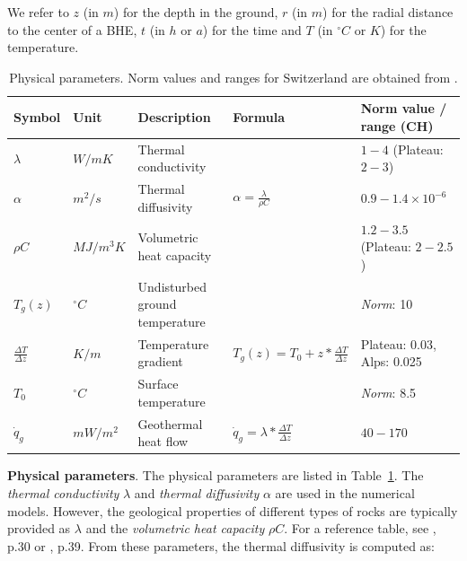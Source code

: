 We refer to $z$ (in $m$) for the depth in the ground, $r$ (in $m$) for the radial distance to the center of a BHE, $t$ (in $h$ or $a$) for the time and $T$ (in $^\circ C$ or $K$) for the temperature. 

\begin{table}[b]
\footnotesize
\caption{Physical parameters. Norm values and ranges for Switzerland are obtained from \citep{sia_sondes_2010}.}
\label{tab:phys_params}

\centering
\begin{tabular}{lllll}
\hline
\textbf{Symbol}             & \textbf{Unit} & \textbf{Description}           & \textbf{Formula}                                      & \textbf{Norm value / range (CH)} \\ \hline
$\lambda$                   & $W/mK$        & Thermal conductivity           &                                                       & $1-4$ (Plateau: $2-3$)           \\
$\alpha$                    & $m^2/s$       & Thermal diffusivity            & $\alpha = \frac{\lambda}{\rho C}$                     & $0.9-1.4 \times 10^{-6}$         \\
$\rho C$                    & $MJ/m^3K$      & Volumetric heat capacity       &                                                       & $1.2-3.5$ (Plateau: $2-2.5$)     \\ \hline
$T_g(z)$                    & $^\circ C$    & Undisturbed ground temperature &                                                       & \textit{Norm}: 10                         \\
$\frac{\Delta T}{\Delta z}$ & $K/m$         & Temperature gradient           & $T_g(z) = T_0 + z * \frac{\Delta T}{\Delta z} $       & Plateau: 0.03, Alps: 0.025       \\
$T_0$                       & $^\circ C$    & Surface temperature            &                                                       & \textit{Norm}: 8.5                        \\ \hline
$\dot{q}_{g}$               & $mW/m^2$      & Geothermal heat flow           & $\dot{q}_{g} = \lambda * \frac{\Delta T}{\Delta z}$   & $40-170$                         \\ \hline
\end{tabular}
\end{table}

\textbf{Physical parameters}. The physical parameters are listed in Table~\ref{tab:phys_params}. The \textit{thermal conductivity} $\lambda$ and \textit{thermal diffusivity} $\alpha$ are used in the numerical models. However, the geological properties of different types of rocks are typically provided as $\lambda$ and the \textit{volumetric heat capacity} $\rho C$. For a reference table, see \cite{pahud_geothermal_2002}, p.30 or \cite{sia_sondes_2010}, p.39. From these parameters, the thermal diffusivity is computed as:

